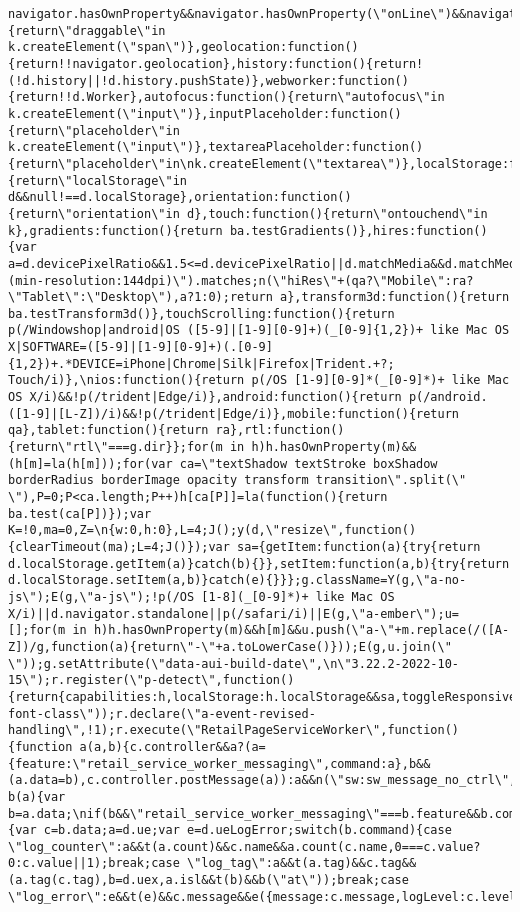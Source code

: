 \documentclass[
]{article}
\begin{document}
\begin{verbatim}
navigator.hasOwnProperty&&navigator.hasOwnProperty(\"onLine\")&&navigator.onLine},dragDrop:function(){return\"draggable\"in k.createElement(\"span\")},geolocation:function(){return!!navigator.geolocation},history:function(){return!(!d.history||!d.history.pushState)},webworker:function(){return!!d.Worker},autofocus:function(){return\"autofocus\"in k.createElement(\"input\")},inputPlaceholder:function(){return\"placeholder\"in k.createElement(\"input\")},textareaPlaceholder:function(){return\"placeholder\"in\nk.createElement(\"textarea\")},localStorage:function(){return\"localStorage\"in d&&null!==d.localStorage},orientation:function(){return\"orientation\"in d},touch:function(){return\"ontouchend\"in k},gradients:function(){return ba.testGradients()},hires:function(){var a=d.devicePixelRatio&&1.5<=d.devicePixelRatio||d.matchMedia&&d.matchMedia(\"(min-resolution:144dpi)\").matches;n(\"hiRes\"+(qa?\"Mobile\":ra?\"Tablet\":\"Desktop\"),a?1:0);return a},transform3d:function(){return ba.testTransform3d()},touchScrolling:function(){return p(/Windowshop|android|OS ([5-9]|[1-9][0-9]+)(_[0-9]{1,2})+ like Mac OS X|SOFTWARE=([5-9]|[1-9][0-9]+)(.[0-9]{1,2})+.*DEVICE=iPhone|Chrome|Silk|Firefox|Trident.+?; Touch/i)},\nios:function(){return p(/OS [1-9][0-9]*(_[0-9]*)+ like Mac OS X/i)&&!p(/trident|Edge/i)},android:function(){return p(/android.([1-9]|[L-Z])/i)&&!p(/trident|Edge/i)},mobile:function(){return qa},tablet:function(){return ra},rtl:function(){return\"rtl\"===g.dir}};for(m in h)h.hasOwnProperty(m)&&(h[m]=la(h[m]));for(var ca=\"textShadow textStroke boxShadow borderRadius borderImage opacity transform transition\".split(\" \"),P=0;P<ca.length;P++)h[ca[P]]=la(function(){return ba.test(ca[P])});var K=!0,ma=0,Z=\n{w:0,h:0},L=4;J();y(d,\"resize\",function(){clearTimeout(ma);L=4;J()});var sa={getItem:function(a){try{return d.localStorage.getItem(a)}catch(b){}},setItem:function(a,b){try{return d.localStorage.setItem(a,b)}catch(e){}}};g.className=Y(g,\"a-no-js\");E(g,\"a-js\");!p(/OS [1-8](_[0-9]*)+ like Mac OS X/i)||d.navigator.standalone||p(/safari/i)||E(g,\"a-ember\");u=[];for(m in h)h.hasOwnProperty(m)&&h[m]&&u.push(\"a-\"+m.replace(/([A-Z])/g,function(a){return\"-\"+a.toLowerCase()}));E(g,u.join(\" \"));g.setAttribute(\"data-aui-build-date\",\n\"3.22.2-2022-10-15\");r.register(\"p-detect\",function(){return{capabilities:h,localStorage:h.localStorage&&sa,toggleResponsiveGrid:ya,responsiveGridEnabled:za}});p(/UCBrowser/i)||h.localStorage&&E(g,sa.getItem(\"a-font-class\"));r.declare(\"a-event-revised-handling\",!1);r.execute(\"RetailPageServiceWorker\",function(){function a(a,b){c.controller&&a?(a={feature:\"retail_service_worker_messaging\",command:a},b&&(a.data=b),c.controller.postMessage(a)):a&&n(\"sw:sw_message_no_ctrl\",1)}function b(a){var b=a.data;\nif(b&&\"retail_service_worker_messaging\"===b.feature&&b.command&&b.data){var c=b.data;a=d.ue;var e=d.ueLogError;switch(b.command){case \"log_counter\":a&&t(a.count)&&c.name&&a.count(c.name,0===c.value?0:c.value||1);break;case \"log_tag\":a&&t(a.tag)&&c.tag&&(a.tag(c.tag),b=d.uex,a.isl&&t(b)&&b(\"at\"));break;case \"log_error\":e&&t(e)&&c.message&&e({message:c.message,logLevel:c.level||\"ERROR\",attribution:c.attribution||\"RetailServiceWorker\"});break;case 
\end{verbatim}
\end{document}
